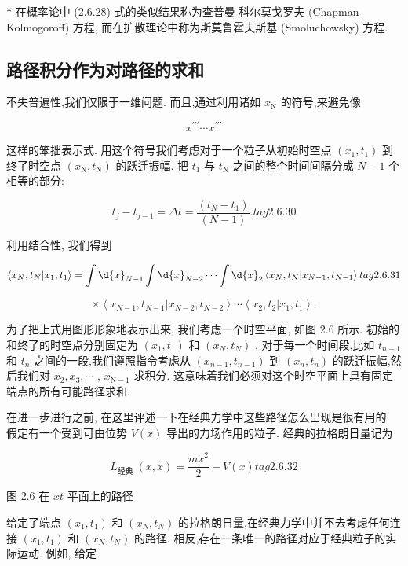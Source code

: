 \documentclass[lang=cn,newtx,10pt,scheme=chinese,thmcnt=section]{elegantbook}
\begin{document}
* 在概率论中 (2.6.28) 式的类似结果称为查普曼-科尔莫戈罗夫 (Chapman-Kolmogoroff) 方程, 而在扩散理论中称为斯莫鲁霍夫斯基 (Smoluchowsky) 方程.

\subsection*{路径积分作为对路径的求和}
不失普遍性,我们仅限于一维问题. 而且,通过利用诸如 ${x}_{\mathrm{N}}$ 的符号,来避免像

$$
{x}^{\prime \prime \prime }\cdots {x}^{\prime \prime \prime }
$$

这样的笨拙表示式. 用这个符号我们考虑对于一个粒子从初始时空点 $\left( {{x}_{1},{t}_{1}}\right)$ 到终了时空点 $\left( {{x}_{\mathrm{N}},{t}_{\mathrm{N}}}\right)$ 的跃迁振幅. 把 ${t}_{1}$ 与 ${t}_{\mathrm{N}}$ 之间的整个时间间隔分成 $N - 1$ 个相等的部分:

$$
{t}_{j} - {t}_{j - 1} = {\Delta t} = \frac{\left( {t}_{N} - {t}_{1}\right) }{\left( N - 1\right) }. tag{2.6.30}
$$

利用结合性, 我们得到

$$
\left\langle {{x}_{N},{t}_{N} | {x}_{1},{t}_{1}}\right\rangle = \int \d{x}_{N - 1}\int \d{x}_{N - 2}\cdots \int \d{x}_{2}\left\langle {{x}_{N},{t}_{N} | {x}_{N - 1},{t}_{N - 1}}\right\rangle tag{2. 6.31}
$$

$$
\times \left\langle {{x}_{N - 1},{t}_{N - 1} | {x}_{N - 2},{t}_{N - 2}}\right\rangle \cdots \left\langle {{x}_{2},{t}_{2} | {x}_{1},{t}_{1}}\right\rangle .
$$

为了把上式用图形形象地表示出来, 我们考虑一个时空平面, 如图 2.6 所示. 初始的和终了的时空点分别固定为 $\left( {{x}_{1},{t}_{1}}\right)$ 和 $\left( {{x}_{N},{t}_{N}}\right)$ . 对于每一个时间段,比如 ${t}_{n - 1}$ 和 ${t}_{n}$ 之间的一段,我们遵照指令考虑从 $\left( {{x}_{n - 1},{t}_{n - 1}}\right)$ 到 $\left( {{x}_{n},{t}_{n}}\right)$ 的跃迁振幅,然后我们对 ${x}_{2},{x}_{3},\cdots$ , ${x}_{\mathrm{N} - 1}$ 求积分. 这意味着我们必须对这个时空平面上具有固定端点的所有可能路径求和.

在进一步进行之前, 在这里评述一下在经典力学中这些路径怎么出现是很有用的. 假定有一个受到可由位势 $V\left( x\right)$ 导出的力场作用的粒子. 经典的拉格朗日量记为

$$
{L}_{\text{经典 }}\left( {x,\dot{x}}\right) = \frac{m{\dot{x}}^{2}}{2} - V\left( x\right) tag{2.6.32}
$$


图 2.6 在 ${xt}$ 平面上的路径

给定了端点 $\left( {{x}_{1},{t}_{1}}\right)$ 和 $\left( {{x}_{N},{t}_{N}}\right)$ 的拉格朗日量,在经典力学中并不去考虑任何连接 $\left( {{x}_{1},{t}_{1}}\right)$ 和 $\left( {{x}_{N},{t}_{N}}\right)$ 的路径. 相反,存在一条唯一的路径对应于经典粒子的实际运动. 例如, 给定
\end{document}
